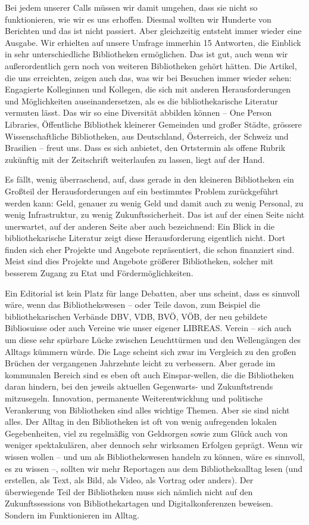 \documentclass[a4paper,
fontsize=11pt,
oneside,
numbers=noperiodatend,
parskip=half-,
bibliography=totoc,
final
]{scrartcl}
\begin{document}
Bei jedem unserer Calls müssen wir damit umgehen, dass sie nicht so
funktionieren, wie wir es uns erhoffen. Diesmal wollten wir Hunderte von
Berichten und das ist nicht passiert. Aber gleichzeitig entsteht immer
wieder eine Ausgabe. Wir erhielten auf unsere Umfrage immerhin 15
Antworten, die Einblick in sehr unterschiedliche Bibliotheken
ermöglichen. Das ist gut, auch wenn wir außerordentlich gern noch von
weiteren Bibliotheken gehört hätten. Die Artikel, die uns erreichten,
zeigen auch das, was wir bei Besuchen immer wieder sehen: Engagierte
Kolleginnen und Kollegen, die sich mit anderen Herausforderungen und
Möglichkeiten auseinandersetzen, als es die bibliothekarische Literatur
vermuten lässt. Das wir so eine Diversität abbilden können -- One Person
Libraries, Öffentliche Bibliothek kleinerer Gemeinden und großer Städte,
grössere Wissenschaftliche Bibliotheken, aus Deutschland, Österreich,
der Schweiz und Brasilien -- freut uns. Dass es sich anbietet, den
Ortstermin als offene Rubrik zukünftig mit der Zeitschrift weiterlaufen
zu lassen, liegt auf der Hand.

Es fällt, wenig überraschend, auf, dass gerade in den kleineren
Bibliotheken ein Großteil der Herausforderungen auf ein bestimmtes
Problem zurückgeführt werden kann: Geld, genauer zu wenig Geld und damit
auch zu wenig Personal, zu wenig Infrastruktur, zu wenig
Zukunftssicherheit. Das ist auf der einen Seite nicht unerwartet, auf
der anderen Seite aber auch bezeichnend: Ein Blick in die
bibliothekarische Literatur zeigt diese Herausforderung eigentlich
nicht. Dort finden sich eher Projekte und Angebote repräsentiert, die
schon finanziert sind. Meist sind dies Projekte und Angebote größerer
Bibliotheken, solcher mit besserem Zugang zu Etat und
Fördermöglichkeiten.

Ein Editorial ist kein Platz für lange Debatten, aber uns scheint, dass
es sinnvoll wäre, wenn das Bibliothekswesen -- oder Teile davon, zum
Beispiel die bibliothekarischen Verbände DBV, VDB, BVÖ, VÖB, der neu
gebildete Bibliosuisse oder auch Vereine wie unser eigener LIBREAS.
Verein -- sich auch um diese sehr spürbare Lücke zwischen Leuchttürmen
und den Wellengängen des Alltags kümmern würde. Die Lage scheint sich
zwar im Vergleich zu den großen Brüchen der vergangenen Jahrzehnte
leicht zu verbessern. Aber gerade im kommunalen Bereich sind es eben oft
auch Einspar-wellen, die die Bibliotheken daran hindern, bei den jeweils
aktuellen Gegenwarts- und Zukunftstrends mitzusegeln. Innovation,
permanente Weiterentwicklung und politische Verankerung von Bibliotheken
sind alles wichtige Themen. Aber sie sind nicht alles. Der Alltag in den
Bibliotheken ist oft von wenig aufregenden lokalen Gegebenheiten, viel
zu regelmäßig von Geldsorgen sowie zum Glück auch von weniger
spektakulären, aber dennoch sehr wirksamen Erfolgen geprägt. Wenn wir
wissen wollen -- und um als Bibliothekswesen handeln zu können, wäre es
sinnvoll, es zu wissen --, sollten wir mehr Reportagen aus dem
Bibliotheksalltag lesen (und erstellen, als Text, als Bild, als Video,
als Vortrag oder anders). Der überwiegende Teil der Bibliotheken muss
sich nämlich nicht auf den Zukunftssessions von Bibliothekartagen und
Digitalkonferenzen beweisen. Sondern im Funktionieren im Alltag.
\end{document}

